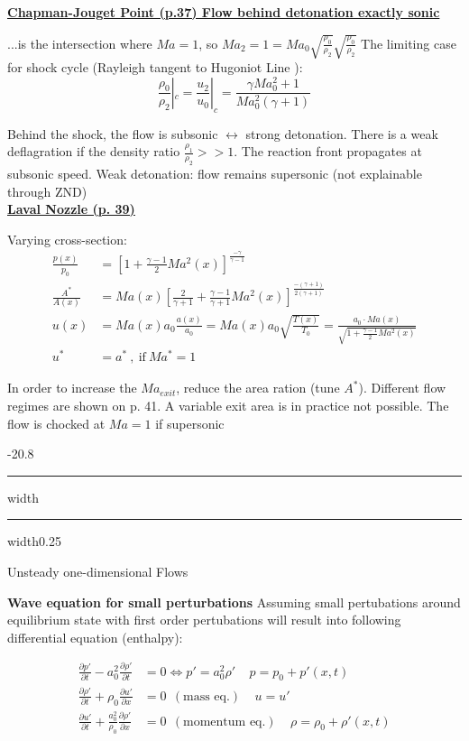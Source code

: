 \documentclass[8pt, landscape, fleqn]{scrartcl}
\makeatletter
\renewcommand{\section}{\@startsection{section}{1}{0mm}%
{-2\baselineskip}{0.8\baselineskip}%
{\hrule depth 0.2pt width\columnwidth\hrule depth1.5pt
width0.25\columnwidth\vspace*{1.2em}\Large\bfseries\rmfamily}}
\makeatother
\begin{document}
\begin{multicols*}{3}
\underline{\textbf{Chapman-Jouget Point (p.37) Flow behind detonation exactly sonic} }

...is the intersection where $Ma=1$, so $Ma_2 = 1 = Ma_0 \sqrt{\frac{\rho_0}{\rho_2}} \sqrt{\frac{\rho_0}{\rho_2}}$
The limiting case for shock cycle (Rayleigh tangent to Hugoniot Line ): 
\begin{equation*}
    \frac{\rho_0}{\rho_2} |_c = \frac{u_2}{u_0} |_c = \frac{ \gamma Ma_0^2 + 1 }{Ma_0^2 (\gamma + 1)}
\end{equation*}

Behind the shock, the flow is subsonic $\leftrightarrow$ strong detonation. There is a weak deflagration if the density ratio $\frac{\rho_1}{\rho_2} >> 1$. The reaction front propagates at subsonic speed.  Weak detonation: flow remains supersonic (not explainable through ZND)\\

\underline{\textbf{Laval Nozzle (p. 39)}}

Varying cross-section:
\begin{align*}
    \frac{p(x)}{p_0} &= \left[ 1 + \frac{\gamma - 1}{2} Ma^2 (x) \right]^{\frac{-\gamma}{\gamma-1}} \\
    \frac{A^*}{A(x)} &= Ma(x) \left[ \frac{2}{\gamma+1} + \frac{\gamma-1}{\gamma+1}Ma^2(x)\right]^{\frac{-(\gamma+1)}{2(\gamma+1)}} \\
    u(x) &= Ma(x) a_0 \frac{a(x)}{a_0} = Ma(x) a_0 \sqrt{\frac{T(x)}{T_0}} = \frac{a_0 \cdot Ma(x)}{\sqrt{1 + \frac{\gamma-1}{2}Ma^2(x)}} \\
    u^* &= a^* ~,~ \text{if}~ Ma^* = 1
\end{align*}

In order to increase the $Ma_{exit}$, reduce the area ration (tune $A^*$). Different flow regimes are shown on p. 41. A variable exit area is in practice not possible.
The flow is chocked at $Ma=1$ if supersonic

\section{Unsteady one-dimensional Flows}

\textbf{Wave equation for small perturbations}
Assuming small pertubations around equilibrium state with first order pertubations will result into following differential equation (enthalpy):

\begin{align*}
    \frac{\partial p'}{\partial t} - a_0^2 \frac{\partial \rho'}{\partial t} &= 0 \Longleftrightarrow p' = a_0^2 \rho' ~~~~~ p = p_0 + p'(x,t) \\
    \frac{\partial \rho'}{\partial t} + \rho_0 \frac{\partial u'}{\partial x} &= 0 ~~ (\text{mass eq.}) ~~~~~ u = u'\\
    \frac{\partial u'}{\partial t} + \frac{a_0^2}{\rho_0} \frac{\partial \rho'}{\partial x} &= 0 ~~ (\text{momentum eq.}) ~~~~~ \rho = \rho_0 + \rho'(x,t)
\end{align*}


\end{multicols*}
\end{document}
